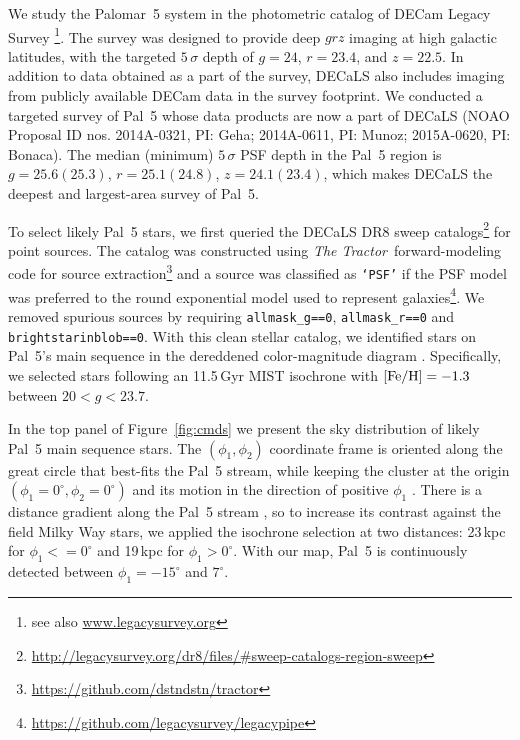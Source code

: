 \documentclass[twocolumn]{aastex62}
\newcommand{\tractor}{\textsl{The Tractor}}
\begin{document}
We study the Palomar~5 system in the photometric catalog of DECam Legacy Survey \citep[DECaLS, part of the DESI Legacy Imaging Surveys,][]{dey2019}\footnote{see also \url{www.legacysurvey.org}}.
The survey was designed to provide deep $grz$ imaging at high galactic latitudes, with the targeted $5\,\sigma$ depth of $g=24$, $r=23.4$, and $z=22.5$.
In addition to data obtained as a part of the survey, DECaLS also includes imaging from publicly available DECam data in the survey footprint.
We conducted a targeted survey of Pal~5 whose data products are now a part of DECaLS (NOAO Proposal ID nos. 2014A-0321, PI: Geha; 2014A-0611, PI: Munoz; 2015A-0620, PI: Bonaca).
The median (minimum) $5\,\sigma$ PSF depth in the Pal~5 region is $g=25.6(25.3)$, $r=25.1(24.8)$, $z=24.1(23.4)$, which makes DECaLS the deepest and largest-area survey of Pal~5.

To select likely Pal~5 stars, we first queried the DECaLS DR8 sweep catalogs\footnote{\url{http://legacysurvey.org/dr8/files/\#sweep-catalogs-region-sweep}} for point sources.
The catalog was constructed using \tractor\ forward-modeling code for source extraction\footnote{\url{https://github.com/dstndstn/tractor}} and a source was classified as \texttt{`PSF'} if the PSF model was preferred to the round exponential model used to represent galaxies\footnote{\url{https://github.com/legacysurvey/legacypipe}}.
We removed spurious sources by requiring \texttt{allmask\_g==0}, \texttt{allmask\_r==0} and \texttt{brightstarinblob==0}.
With this clean stellar catalog, we identified stars on Pal~5's main sequence in the dereddened color-magnitude diagram \citep[using the re-calibrated SFD dust map;][]{Schlegel:1998, Schlafly:2011}.
Specifically, we selected stars following an 11.5\,Gyr MIST isochrone with $\rm [Fe/H] = -1.3$ \citep{Choi:2016} between $20<g<23.7$.

In the top panel of Figure~\ref{fig:cmds} we present the sky distribution of likely Pal~5 main sequence stars.
The $(\phi_1,\phi_2)$ coordinate frame is oriented along the great circle that best-fits the Pal~5 stream, while keeping the cluster at the origin $(\phi_1 = 0^\circ,\phi_2 = 0^\circ)$  and its motion in the direction of positive $\phi_1$ \citep{gala}.
There is a distance gradient along the Pal~5 stream \citep{Ibata:2016}, so to increase its contrast against the field Milky Way stars, we applied the isochrone selection at two distances: 23\,kpc for $\phi_1<=0^\circ$ and 19\,kpc for $\phi_1>0^\circ$.
With our map, Pal~5 is continuously detected between $\phi_1=-15^\circ$ and $7^\circ$.
\end{document}
